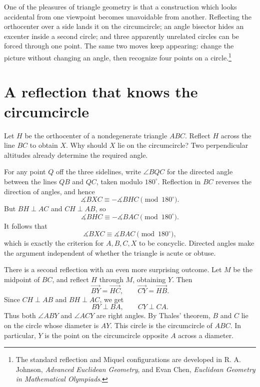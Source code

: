 
One of the pleasures of triangle geometry is that a construction which looks accidental from one viewpoint becomes unavoidable from another. Reflecting the orthocenter over a side lands it on the circumcircle; an angle bisector hides an excenter inside a second circle; and three apparently unrelated circles can be forced through one point. The same two moves keep appearing: change the picture without changing an angle, then recognize four points on a circle.\footnote{The standard reflection and Miquel configurations are developed in R. A. Johnson, \emph{Advanced Euclidean Geometry}, and Evan Chen, \emph{Euclidean Geometry in Mathematical Olympiads}.}

\section{A reflection that knows the circumcircle}

Let \(H\) be the orthocenter of a nondegenerate triangle \(ABC\). Reflect \(H\) across the line \(BC\) to obtain \(X\). Why should \(X\) lie on the circumcircle? Two perpendicular altitudes already determine the required angle.

For any point \(Q\) off the three sidelines, write \(\angle BQC\) for the directed angle between the lines \(QB\) and \(QC\), taken modulo \(180^\circ\). Reflection in \(BC\) reverses the direction of angles, and hence
\[
 \measuredangle BXC\equiv-\measuredangle BHC\pmod{180^\circ}.
\]
But \(BH\perp AC\) and \(CH\perp AB\), so
\[
 \measuredangle BHC\equiv-\measuredangle BAC\pmod{180^\circ}.
\]
It follows that
\[
 \boxed{\measuredangle BXC\equiv\measuredangle BAC\pmod{180^\circ}},
\]
which is exactly the criterion for \(A,B,C,X\) to be concyclic. Directed angles make the argument independent of whether the triangle is acute or obtuse.

There is a second reflection with an even more surprising outcome. Let \(M\) be the midpoint of \(BC\), and reflect \(H\) through \(M\), obtaining \(Y\). Then
\[
 \overrightarrow{BY}=\overrightarrow{HC},\qquad
 \overrightarrow{CY}=\overrightarrow{HB}.
\]
Since \(CH\perp AB\) and \(BH\perp AC\), we get
\[
 BY\perp BA,\qquad CY\perp CA.
\]
Thus both \(\angle ABY\) and \(\angle ACY\) are right angles. By Thales' theorem, \(B\) and \(C\) lie on the circle whose diameter is \(AY\). This circle is the circumcircle of \(ABC\). In particular, \(Y\) is the point on the circumcircle opposite \(A\) across a diameter.

